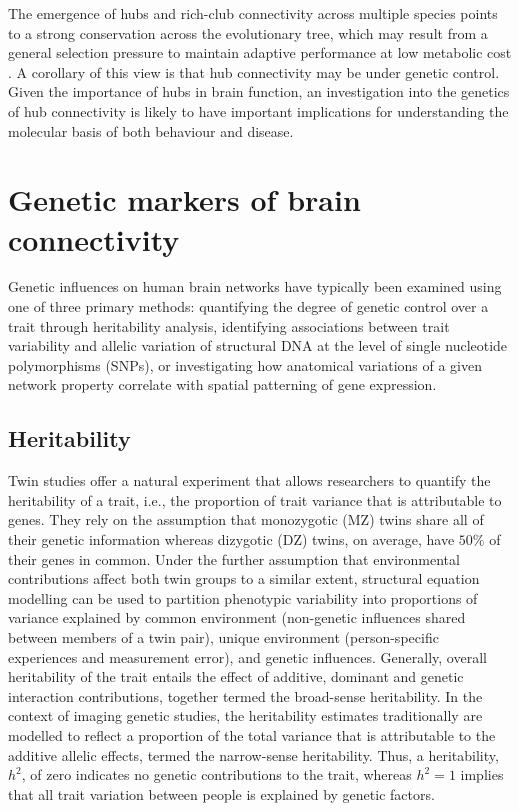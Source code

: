 The emergence of hubs and rich-club connectivity across multiple species points to a strong conservation across the evolutionary tree, which may result from a general selection pressure to maintain adaptive performance at low metabolic cost \citep{Bullmore2012}. A corollary of this view is that hub connectivity may be under genetic control. Given the importance of hubs in brain function, an investigation into the genetics of hub connectivity is likely to have important implications for understanding the molecular basis of both behaviour and disease.
\section{Genetic markers of brain connectivity}

Genetic influences on human brain networks have typically been examined using one of three primary methods: quantifying the degree of genetic control over a trait through heritability analysis, identifying associations between trait variability and allelic variation of structural DNA at the level of single nucleotide polymorphisms (SNPs), or investigating how anatomical variations of a given network property correlate with spatial patterning of gene expression.

\subsection{Heritability}

Twin studies offer a natural experiment that allows researchers to quantify the heritability of a trait, i.e., the proportion of trait variance that is attributable to genes. They rely on the assumption that monozygotic (MZ) twins share all of their genetic information whereas dizygotic (DZ) twins, on average, have $50\%$ of their genes in common. Under the further assumption that environmental contributions affect both twin groups to a similar extent, structural equation modelling can be used to partition phenotypic variability into proportions of variance explained by common environment (non-genetic influences shared between members of a twin pair), unique environment (person-specific experiences and measurement error), and genetic influences. Generally, overall heritability of the trait entails the effect of additive, dominant and genetic interaction contributions, together termed the broad-sense heritability. In the context of imaging genetic studies, the heritability estimates traditionally are modelled to reflect a proportion of the total variance that is attributable to the additive allelic effects, termed the narrow-sense heritability. Thus, a heritability, $h^{2}$, of zero indicates no genetic contributions to the trait, whereas $h^{2}=1$ implies that all trait variation between people is explained by genetic factors.

